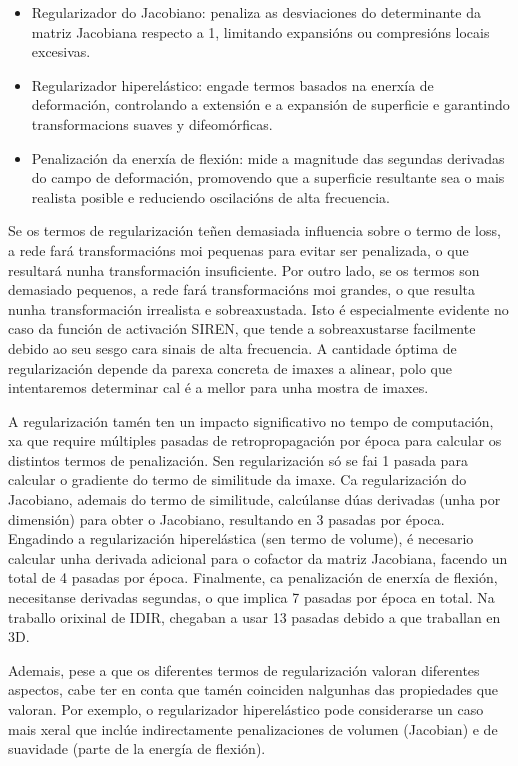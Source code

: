 \begin{itemize}
    \item Regularizador do Jacobiano: penaliza as desviaciones do determinante da matriz Jacobiana respecto a 1, limitando expansións ou compresións locais excesivas.
    \item Regularizador hiperelástico: engade termos basados na enerxía de deformación, controlando a extensión e a expansión de superficie e garantindo transformacions suaves y difeomórficas.
    \item Penalización da enerxía de flexión: mide a magnitude das segundas derivadas do campo de deformación, promovendo que a superficie resultante sea o mais realista posible e reduciendo oscilacións de alta frecuencia.
\end{itemize}

Se os termos de regularización teñen demasiada influencia sobre o termo de loss, a rede fará transformacións moi pequenas para evitar ser penalizada, o que resultará nunha transformación insuficiente.
Por outro lado, se os termos son demasiado pequenos, a rede fará transformacións moi grandes, o que resulta nunha transformación irrealista e sobreaxustada. Isto é especialmente evidente no caso da función de activación SIREN, que tende a sobreaxustarse facilmente debido ao seu sesgo cara sinais de alta frecuencia.
A cantidade óptima de regularización depende da parexa concreta de imaxes a alinear, polo que intentaremos determinar cal é a mellor para unha mostra de imaxes.

A regularización tamén ten un impacto significativo no tempo de computación, xa que require múltiples pasadas de retropropagación por época para calcular os distintos termos de penalización.
Sen regularización só se fai 1 pasada para calcular o gradiente do termo de similitude da imaxe.
Ca regularización do Jacobiano, ademais do termo de similitude, calcúlanse dúas derivadas (unha por dimensión) para obter o Jacobiano, resultando en 3 pasadas por época.
Engadindo a regularización hiperelástica (sen termo de volume), é necesario calcular unha derivada adicional para o cofactor da matriz Jacobiana, facendo un total de 4 pasadas por época.
Finalmente, ca penalización de enerxía de flexión, necesitanse derivadas segundas, o que implica 7 pasadas por época en total.
Na traballo orixinal de IDIR, chegaban a usar 13 pasadas debido a que traballan en 3D.

Ademais, pese a que os diferentes termos de regularización valoran diferentes aspectos, cabe ter en conta que tamén coinciden nalgunhas das propiedades que valoran.
Por exemplo, o regularizador hiperelástico pode considerarse un caso mais xeral que inclúe indirectamente penalizaciones de volumen (Jacobian) e de suavidade (parte de la energía de flexión).

